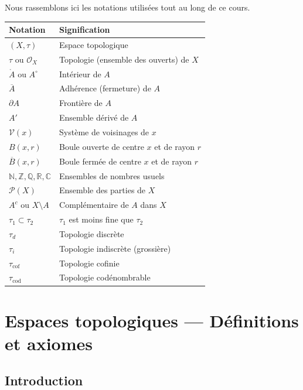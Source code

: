 \documentclass[12pt,a4paper,openany]{book}
\theoremstyle{definition}
\theoremstyle{cours}
\theoremstyle{coursnormal}
\newcommand{\N}{\mathbb{N}}
\newcommand{\Z}{\mathbb{Z}}
\newcommand{\Q}{\mathbb{Q}}
\newcommand{\R}{\mathbb{R}}
\newcommand{\C}{\mathbb{C}}
\newcommand{\Int}[1]{\mathring{#1}}
\newcommand{\Cl}[1]{\overline{#1}}
\newcommand{\Fr}[1]{\partial #1}
\newcommand{\Vois}[1]{\mathcal{V}(#1)}
\newcommand{\Ouv}[1]{\mathcal{O}_{#1}}
\begin{document}
Nous rassemblons ici les notations utilisées tout au long de ce cours.

\bigskip

\begin{tabular}{ll}
\hline
\textbf{Notation} & \textbf{Signification} \\
\hline
$(X,\tau)$ & Espace topologique \\
$\tau$ ou $\Ouv{X}$ & Topologie (ensemble des ouverts) de $X$ \\
$\Int{A}$ ou $A^{\circ}$ & Intérieur de $A$ \\
$\Cl{A}$ & Adhérence (fermeture) de $A$ \\
$\Fr{A}$ & Frontière de $A$ \\
$A'$ & Ensemble dérivé de $A$ \\
$\Vois{x}$ & Système de voisinages de $x$ \\
$B(x,r)$ & Boule ouverte de centre $x$ et de rayon $r$ \\
$\overline{B}(x,r)$ & Boule fermée de centre $x$ et de rayon $r$ \\
$\N, \Z, \Q, \R, \C$ & Ensembles de nombres usuels \\
$\mathcal{P}(X)$ & Ensemble des parties de $X$ \\
$A^c$ ou $X \setminus A$ & Complémentaire de $A$ dans $X$ \\
$\tau_1 \subset \tau_2$ & $\tau_1$ est moins fine que $\tau_2$ \\
$\tau_d$ & Topologie discrète \\
$\tau_i$ & Topologie indiscrète (grossière) \\
$\tau_{\mathrm{cof}}$ & Topologie cofinie \\
$\tau_{\mathrm{cod}}$ & Topologie codénombrable \\
\hline
\end{tabular}

\chapter{Espaces topologiques --- Définitions et axiomes}
\label{chap:espaces-topologiques}

\section*{Introduction}
\end{document}
